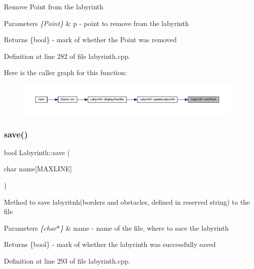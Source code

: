 Remove Point from the labyrinth 
\begin{DoxyParams}{Parameters}
{\em \{\+Point\}} & p -\/ point to remove from the labyrinth \\
\hline
\end{DoxyParams}
\begin{DoxyReturn}{Returns}
\{bool\} -\/ mark of whether the Point was removed 
\end{DoxyReturn}


Definition at line 282 of file labyrinth.\+cpp.

Here is the caller graph for this function\+:
\nopagebreak
\begin{figure}[H]
\begin{center}
\leavevmode
\includegraphics[width=350pt]{class_labyrinth_a24d98083c011da23695425ec69d583a5_icgraph}
\end{center}
\end{figure}
\mbox{\label{class_labyrinth_a99e6b33f94d6d64f9c5a4fa78f08c007}} 
\subsubsection{\texorpdfstring{save()}{save()}}
{\footnotesize\ttfamily bool Labyrinth\+::save (\begin{DoxyParamCaption}\item[{char}]{name\mbox{[}\+M\+A\+X\+L\+I\+N\+E\mbox{]} }\end{DoxyParamCaption})}

Method to save labyritnh(borders and obstacles, defined in reserved string) to the file 
\begin{DoxyParams}{Parameters}
{\em \{char$\ast$\}} & name -\/ name of the file, where to sace the labyrinth \\
\hline
\end{DoxyParams}
\begin{DoxyReturn}{Returns}
\{bool\} -\/ mark of whether the labyrinth was successfully saved 
\end{DoxyReturn}


Definition at line 293 of file labyrinth.\+cpp.

